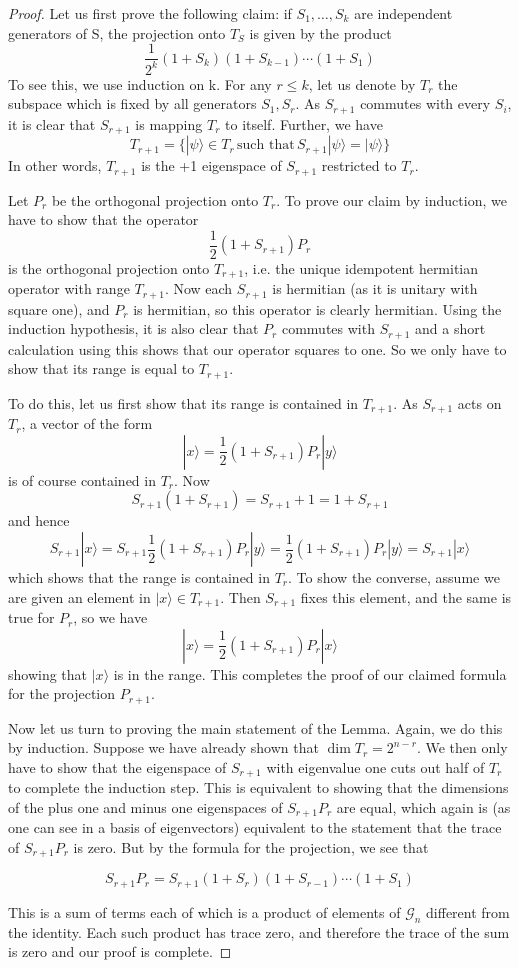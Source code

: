 \documentclass[a4paper, draft]{article}
\theoremstyle{own}
\theoremstyle{remark}
\begin{document}
\begin{proof}
Let us first prove the following claim: if $S_1, \dots, S_k$ are independent generators of S, the projection onto $T_S$ is given by the product
$$
\frac{1}{2^k}(1+S_k)(1+S_{k-1}) \cdots (1+S_1)
$$
To see this, we use induction on k. For any $r \leq k$, let us denote by $T_r$ the subspace which is fixed by all generators $S_1, S_r$. As $S_{r+1}$ commutes with every $S_i$, it is clear that $S_{r+1}$ is mapping $T_r$ to itself. Further, we have
$$
T_{r+1} = \{ |\psi\rangle \in T_r \, \text{such that} \,  S_{r+1} |\psi \rangle = |\psi \rangle \}
$$
In other words, $T_{r+1}$ is the +1 eigenspace of $S_{r+1}$ restricted to $T_r$. 

Let $P_r$ be the orthogonal projection onto $T_r$. To prove our claim by induction, we have to show that the operator
$$
\frac{1}{2} (1 + S_{r+1}) P_r
$$
is the orthogonal projection onto $T_{r+1}$, i.e. the unique idempotent hermitian operator with range $T_{r+1}$. Now each $S_{r+1}$ is hermitian (as it is unitary with square one), and $P_r$ is hermitian, so this operator is clearly hermitian. Using the induction hypothesis, it is also clear that $P_r$ commutes with $S_{r+1}$ and a short calculation using this shows that our operator squares to one. So we only have to show that its range is equal to $T_{r+1}$.

To do this, let us first show that its range is contained in $T_{r+1}$. As $S_{r+1}$ acts on $T_r$, a vector of the form
$$
|x \rangle = \frac{1}{2}(1 + S_{r+1}) P_r |y \rangle
$$
is of course contained in $T_r$. Now
$$
S_{r+1}(1+S_{r+1}) = S_{r+1} + 1 = 1 + S_{r+1}
$$
and hence
$$
S_{r+1} |x \rangle = S_{r+1} \frac{1}{2}(1 + S_{r+1}) P_r |y \rangle = \frac{1}{2}(1 + S_{r+1}) P_r |y \rangle = S_{r+1} |x \rangle
$$
which shows that the range is contained in $T_r$. To show the converse, assume we are given an element in $|x \rangle \in T_{r+1}$. Then $S_{r+1}$ fixes this element, and the same is true for $P_r$, so we have
$$
|x \rangle = \frac{1}{2} (1 + S_{r+1}) P_r |x \rangle
$$
showing that $|x \rangle$ is in the range. This completes the proof of our claimed formula for the projection $P_{r+1}$. 

Now let us turn to proving the main statement of the Lemma. Again, we do this by induction. Suppose we have already shown that $\dim T_r = 2^{n-r}$. We then only have to show that the eigenspace of $S_{r+1}$ with eigenvalue one cuts out half of $T_r$ to complete the induction step. This is equivalent to showing that the dimensions of the plus one and minus one eigenspaces of $S_{r+1} P_r$ are equal, which again is (as one can see in a basis of eigenvectors) equivalent to the statement that the trace of $S_{r+1} P_r$ is zero. But by the formula for the projection, we see that

$$
S_{r+1} P_r = S_{r+1} (1 + S_r) (1 + S_{r-1}) \cdots (1 + S_1)
$$

This is a sum of terms each of which is a product of elements of $\mathcal{G}_n$ different from the identity. Each such product has trace zero, and therefore the trace of the sum is zero and our proof is complete.
\end{proof}
\end{document}
